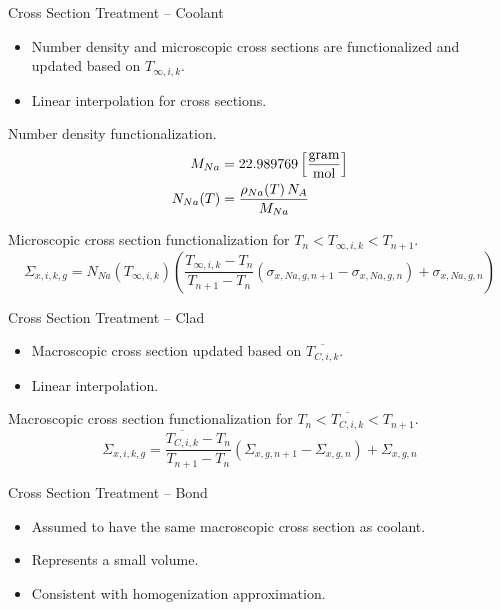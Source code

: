 \begin{frame}{Cross Section Treatment -- Coolant}
  \begin{itemize}
    \item Number density and microscopic cross sections are functionalized 
      and updated based on $T_{\infty,i,k}$.
    \item Linear interpolation for cross sections.
  \end{itemize}

  Number density functionalization.
  \begin{align}
    \label{eq:number_density_sodium}
    M_{Na} &= 22.989769 \left[\text{{$\frac{\text{gram}}{\text{mol}}$}}\right] \\
    N_{Na}(T) &= \frac{\rho_{Na}(T) \, N_A}{M_{Na}}
  \end{align}

  Microscopic cross section functionalization for ${T_{n} < T_{\infty,i,k} <
  T_{n+1}}$.
  \begin{equation}
    \label{eq:xs_cool}
    \Sigma_{x,i,k,g} = N_{Na}(T_{\infty,i,k}) 
      \left( \frac{T_{\infty,i,k} - T_{n}}{T_{n+1}-T_{n}} 
      (\sigma_{x,Na,g,n+1} - \sigma_{x,Na,g,n})  + \sigma_{x,Na,g,n}\right)
  \end{equation}
\end{frame}

\begin{frame}{Cross Section Treatment -- Clad}
  \begin{itemize}
    \item Macroscopic cross section updated based on $\overline{T_{C,i,k}}$.
    \item Linear interpolation.
  \end{itemize}

  Macroscopic cross section functionalization for ${T_n < \overline{T_{C,i,k}} <
  T_{n+1}}$.
  \begin{equation}
    \label{eq:xs_linear_interpolation}
    \Sigma_{x,i,k,g} = 
      \frac{\overline{T_{C,i,k}} - T_{n}}{T_{n+1}-T_{n}} 
      (\Sigma_{x,g,n+1} - \Sigma_{x,g,n})  + \Sigma_{x,g,n}
  \end{equation}
\end{frame}

\begin{frame}{Cross Section Treatment -- Bond}
  \begin{itemize}
    \item Assumed to have the same macroscopic cross section as coolant.
    \item Represents a small volume.
    \item Consistent with homogenization approximation.
  \end{itemize}
\end{frame}

